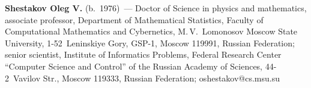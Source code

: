 \vspace*{3pt}

\noindent
\textbf{Shestakov Oleg V.} (b.\ 1976)~--- 
Doctor of Science in physics and mathematics, associate professor, 
Department of Mathematical Statistics, Faculty of Computational Mathematics 
and Cybernetics, M.\,V.~Lomonosov Moscow State University, 1-52~Leninskiye Gory, 
GSP-1, Moscow 119991, Russian Federation; senior scientist, 
Institute of Informatics Problems, Federal Research Center 
``Computer Science and Control''
of the Russian Academy of Sciences, 44-2~Vavilov Str., Moscow 119333, 
Russian Federation; \mbox{oshestakov@cs.msu.su}
\label{end\stat}


\renewcommand{\bibname}{\protect\rm Литература}